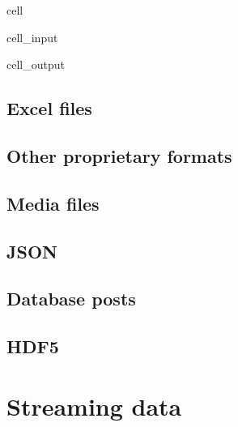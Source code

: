 \documentclass[letterpaper,10pt,english]{jupyterBook}
\begin{document}
\begin{sphinxuseclass}{cell}
\begin{sphinxVerbatimInput}
\begin{sphinxuseclass}{cell_input}
\end{sphinxuseclass}\end{sphinxVerbatimInput}
\begin{sphinxVerbatimOutput}

\begin{sphinxuseclass}{cell_output}
\noindent{}

\end{sphinxuseclass}\end{sphinxVerbatimOutput}

\end{sphinxuseclass}

\subsection{Excel files}
\label{\detokenize{2_Data_sources/Formats/Data_formats:excel-files}}

\subsection{Other proprietary formats}
\label{\detokenize{2_Data_sources/Formats/Data_formats:other-proprietary-formats}}

\subsection{Media files}
\label{\detokenize{2_Data_sources/Formats/Data_formats:media-files}}

\subsection{JSON}
\label{\detokenize{2_Data_sources/Formats/Data_formats:json}}

\subsection{Database posts}
\label{\detokenize{2_Data_sources/Formats/Data_formats:database-posts}}

\subsection{HDF5}
\label{\detokenize{2_Data_sources/Formats/Data_formats:hdf5}}
\sphinxstepscope


\section{Streaming data}
\label{\detokenize{2_Data_sources/Formats/Streaming_data:streaming-data}}\label{\detokenize{2_Data_sources/Formats/Streaming_data::doc}}
\sphinxstepscope
\end{document}

